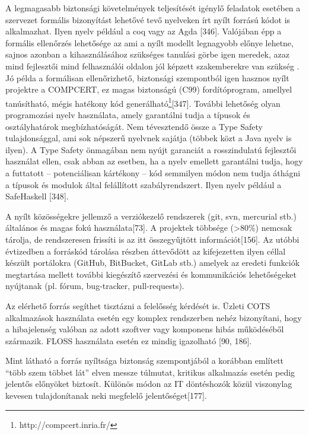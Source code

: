 \documentclass[12pt,magyar,a4paper,oneside]{scrreprt}
\begin{document}
A legmagasabb biztonsági követelmények teljesítését igénylő feladatok
esetében a szervezet formális bizonyítást lehetővé tevő nyelveken írt
nyílt forrású kódot is alkalmazhat. Ilyen nyelv például a coq vagy az
Agda {[}346{]}. Valójában épp a formális ellenőrzés lehetősége az ami a
nyílt modellt legnagyobb előnye lehetne, sajnos azonban a
kihasználásához szükséges tanulási görbe igen meredek, azaz mind
fejlesztői mind felhasználói oldalon jól képzett szakemberekre van
szükség . Jó példa a formálisan ellenőrizhető, biztonsági szempontból
igen hasznos nyílt projektre a COMPCERT, ez magas biztonságú (C99)
fordítóprogram, amellyel tanúsítható, mégis hatékony kód
generálható\footnote{http://compcert.inria.fr/}{[}347{]}. További
lehetőség olyan programozási nyelv használata, amely garantálni tudja a
típusok és osztályhatárok megbízhatóságát. Nem tévesztendő össze a Type
Safety tulajdonsággal, ami sok népszerű nyelvnek sajátja (többek közt a
Java nyelv is ilyen). A Type Safety önmagában nem nyújt garanciát a
rosszindulatú fejlesztői használat ellen, csak abban az esetben, ha a
nyelv emellett garantálni tudja, hogy a futtatott -- potenciálisan
kártékony -- kód semmilyen módon nem tudja áthágni a típusok és modulok
által felállított szabályrendszert. Ilyen nyelv például a SafeHaskell
{[}348{]}.

A nyílt közösségekre jellemző a verziókezelő rendszerek (git, svn,
mercurial stb.) általános és magas fokú használata{[}73{]}. A projektek
többsége (\textgreater80\%) nemcsak tárolja, de rendszeresen frissíti is
az itt összegyűjtött információt{[}156{]}. Az utóbbi évtizedben a
forráskód tárolása részben áttevődött az kifejezetten ilyen céllal
készült portálokra (GitHub, BitBucket, GitLab stb.) amelyek az eredeti
funkciók megtartása mellett további kiegészítő szervezési és
kommunikációs lehetőségeket nyújtanak (pl. fórum, bug-tracker,
pull-requests).

Az elérhető forrás segíthet tisztázni a felelősség kérdését is. Üzleti
COTS alkalmazások használata esetén egy komplex rendszerben nehéz
bizonyítani, hogy a hibajelenség valóban az adott szoftver vagy
komponens hibás működéséből származik. FLOSS használata esetén ez mindig
igazolható {[}90, 186{]}.

Mint látható a forrás nyíltsága biztonság szempontjából a korábban
említett ``több szem többet lát'' elven messze túlmutat, kritikus
alkalmazás esetén pedig jelentős előnyöket biztosít. Különös módon az IT
döntéshozók közül viszonylag kevesen tulajdonítanak neki megfelelő
jelentőséget{[}177{]}.
\end{document}
